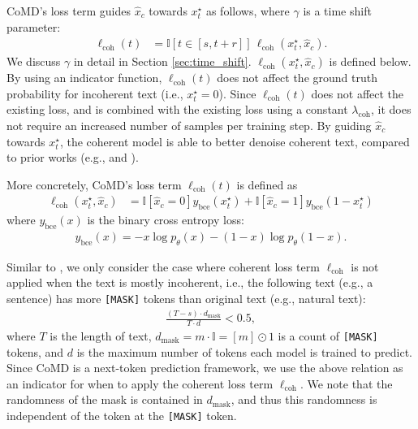 \documentclass{article} %
\begin{document}
CoMD's loss term guides $\hat x_c$ towards $x^\star_t$ as follows, where $\gamma$ is a time shift parameter:
\begin{align}
\label{eq:coherent_loss_def_definition}
    \ell_\mathrm{coh}(t) &= \mathbb I[t \in [s,t+r]] \,\ell_{\mathrm{coh}}(x^\star_t, \hat x_c).
\end{align}
We discuss $\gamma$ in detail in Section \ref{sec:time_shift}. $\ell_\mathrm{coh}(x^\star_t,\hat x_c)$ is defined below. By using an indicator function, $\ell_\mathrm{coh}(t)$ does not affect the ground truth probability for incoherent text (i.e., $x^\star_t=0$). Since $\ell_\mathrm{coh}(t)$ does not affect the existing loss, and is combined with the existing loss using a constant $\lambda_\mathrm{coh}$, it does not require an increased number of samples per training step. By guiding $\hat x_c$ towards $x^\star_t$, the coherent model is able to better denoise coherent text, compared to prior works (e.g., \citet{austin2023structured} and \citet{shih2022training}).

More concretely, CoMD's loss term $\ell_\mathrm{coh}(t)$ is defined as
\begin{align}
    \ell_\mathrm{coh}(x^\star_t,\hat x_c) &= \mathbb I[\hat x_c=0] y_\mathrm{bce}(x^\star_t) + \mathbb I[\hat x_c=1] y_\mathrm{bce}(1-x^\star_t) \label{eq:coherent_loss}
\end{align}
where $y_\mathrm{bce}(x)$ is the binary cross entropy loss:
\begin{align}
    y_\mathrm{bce}(x) = - x \log p_\theta(x) - (1-x)\log p_\theta(1-x).
\end{align}

Similar to \citet{shih2025simplified}, we only consider the case where coherent loss term $\ell_\mathrm{coh}$ is not applied when the text is mostly incoherent, i.e., the following text (e.g., a sentence) has more \texttt{[MASK]} tokens than original text (e.g., natural text): 
\begin{align}
\label{eq:inv_bound}
    \frac{(T-s)\cdot d_\mathrm{mask}}{T\cdot d} < 0.5, 
\end{align}
where $T$ is the length of text, $d_\mathrm{mask}=m\cdot \mathbb I = [m] \odot 1$ is a count of \texttt{[MASK]} tokens, and $d$ is the maximum number of tokens each model is trained to predict. Since CoMD is a next-token prediction framework, we use the above relation as an indicator for when to apply the coherent loss term $\ell_\mathrm{coh}$. We note that the randomness of the mask is contained in $d_\mathrm{mask}$, and thus this randomness is independent of the token at the \texttt{[MASK]} token. 
\end{document}
